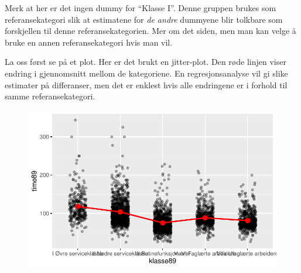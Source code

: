\documentclass[
  letterpaper,
  DIV=11,
  numbers=noendperiod]{scrreprt}
\newenvironment{Shaded}{\begin{snugshade}}{\end{snugshade}}
\newcommand{\AttributeTok}[1]{\textcolor[rgb]{0.40,0.45,0.13}{#1}}
\newcommand{\CommentTok}[1]{\textcolor[rgb]{0.37,0.37,0.37}{#1}}
\newcommand{\DecValTok}[1]{\textcolor[rgb]{0.68,0.00,0.00}{#1}}
\newcommand{\FunctionTok}[1]{\textcolor[rgb]{0.28,0.35,0.67}{#1}}
\newcommand{\NormalTok}[1]{\textcolor[rgb]{0.00,0.23,0.31}{#1}}
\newcommand{\SpecialCharTok}[1]{\textcolor[rgb]{0.37,0.37,0.37}{#1}}
\newcommand{\StringTok}[1]{\textcolor[rgb]{0.13,0.47,0.30}{#1}}
\theoremstyle{definition}
\theoremstyle{remark}
\begin{document}
Merk at her er det ingen dummy for ``Klasse I''. Denne gruppen brukes
som referansekategori slik at estimatene for \emph{de andre} dummyene
blir tolkbare som forskjellen til denne referansekategorien. Mer om det
siden, men man kan velge å bruke en annen referansekategori hvis man
vil.

La oss først se på et plot. Her er det brukt en jitter-plot. Den røde
linjen viser endring i gjennomsnitt mellom de kategoriene. En
regresjonsanalyse vil gi slike estimater på differanser, men det er
enklest hvis alle endringene er i forhold til samme referansekategori.

\begin{Shaded}
\end{Shaded}

\begin{figure}[H]

{\centering \includegraphics{./linearRegresjon_files/figure-pdf/unnamed-chunk-14-1.pdf}

}

\end{figure}
\end{document}
